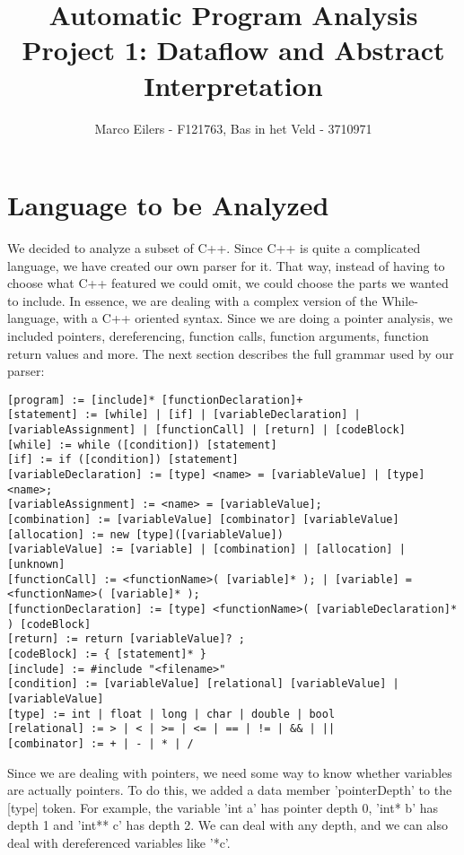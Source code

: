 \documentclass[a4paper,11pt]{article}
\begin{document}
\title{Automatic Program Analysis\\Project 1: Dataflow and Abstract Interpretation}
\author{Marco Eilers - F121763, Bas in het Veld - 3710971}

\maketitle

\section{Language to be Analyzed}
We decided to analyze a subset of C++. 
Since C++ is quite a complicated language, we have created our own parser for it. That way, instead of having to choose what C++ featured we could omit, we could choose the parts we wanted to include. In essence, we are dealing with a complex version of the While-language, with a C++ oriented syntax. Since we are doing a pointer analysis, we included pointers, dereferencing, function calls, function arguments, function return values and more. The next section describes the full grammar used by our parser:

\begin{lstlisting}
[program] := [include]* [functionDeclaration]+
[statement] := [while] | [if] | [variableDeclaration] | [variableAssignment] | [functionCall] | [return] | [codeBlock]
[while] := while ([condition]) [statement]
[if] := if ([condition]) [statement]
[variableDeclaration] := [type] <name> = [variableValue] | [type] <name>;
[variableAssignment] := <name> = [variableValue];
[combination] := [variableValue] [combinator] [variableValue]
[allocation] := new [type]([variableValue])
[variableValue] := [variable] | [combination] | [allocation] | [unknown]
[functionCall] := <functionName>( [variable]* ); | [variable] = <functionName>( [variable]* );
[functionDeclaration] := [type] <functionName>( [variableDeclaration]* ) [codeBlock]
[return] := return [variableValue]? ;
[codeBlock] := { [statement]* }
[include] := #include "<filename>"
[condition] := [variableValue] [relational] [variableValue] | 	[variableValue]
[type] := int | float | long | char | double | bool
[relational] := > | < | >= | <= | == | != | && | ||
[combinator] := + | - | * | /
\end{lstlisting}

Since we are dealing with pointers, we need some way to know whether variables are actually pointers. To do this, we added a data member 'pointerDepth' to the [type] token. For example, the variable 'int a' has pointer depth 0, 'int* b' has depth 1 and 'int** c' has depth 2. We can deal with any depth, and we can also deal with dereferenced variables like '*c'.
\end{document}
